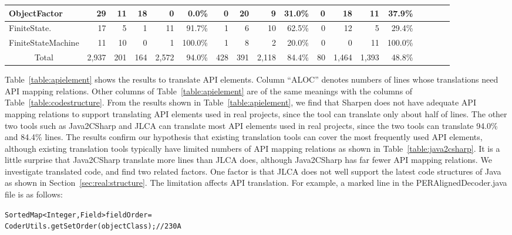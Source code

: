 \begin{table*}[t]
\begin{SmallOut}
\begin {tabular} {|l|r|r|r|r|r|r|r|r|r|r|r|r|r|r|r|r|r|}
\hline
  ObjectFactor                 & 29   & 11 & 18  & 0   &  0.0\%& 0   & 20  & 9   & 31.0\% & 0  & 18& 11   & 37.9\%\\
\hline
  FiniteState.    & 17   & 5  & 1   & 11  & 91.7\% & 1   & 6  & 10  & 62.5\% & 0  & 12& 5    & 29.4\%\\
\hline
  FiniteStateMachine           & 11   & 10 & 0   & 1   & 100.0\%& 1   & 8  & 2   &  20.0\%& 0  & 0 & 11   & 100.0\%\\
\hline\hline
   \multicolumn{1}{|c|}{Total} & 2,937 & 201& 164 &2,572 &  94.0\%& 428 & 391& 2,118&  84.4\%& 80 &1,464&1,393 & 48.8\%\\
\hline
\end{tabular}%
 \label{table:apielement}
\end{SmallOut}%
\end{table*}

Table~\ref{table:apielement} shows the results to translate API elements. Column ``ALOC'' denotes numbers of lines whose translations need API mapping relations. Other columns of Table~\ref{table:apielement} are of the same meanings with the columns of Table~\ref{table:codestructure}. From the results shown in Table~\ref{table:apielement}, we find that Sharpen does not have adequate API mapping relations to support translating API elements used in real projects, since the tool can translate only about half of lines. The other two tools such as Java2CSharp and JLCA can translate most API elements used in real projects, since the two tools can translate 94.0\% and 84.4\% lines. The results confirm our hypothesis that existing translation tools can cover the most frequently used API elements, although existing translation tools typically have limited numbers of API mapping relations as shown in Table~\ref{table:java2csharp}. It is a little surprise that Java2CSharp translate more lines than JLCA does, although Java2CSharp has far fewer API mapping relations. We investigate translated code, and find two related factors. One factor is that JLCA does not well support the latest code structures of Java as shown in Section~\ref{sec:real:structure}. The limitation affects API translation. For example, a marked line in the PERAlignedDecoder.java file is as follows:

\begin{CodeOut}%
\begin{alltt}
SortedMap<Integer,Field> fieldOrder =
        CoderUtils.getSetOrder(objectClass);//230A
\end{alltt}
\end{CodeOut}

